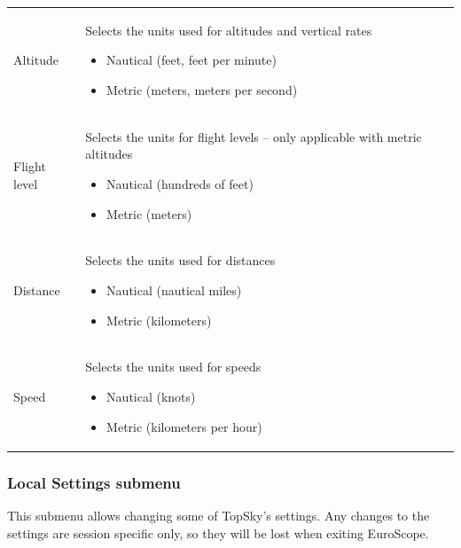 \documentclass[a4paper,oneside,11pt]{memoir}
\begin{document}
\begin{longtable}{p{5cm} p{7.5cm}}
  Altitude & Selects the units used for altitudes and vertical rates
    \begin{itemize}
      \item Nautical (feet, feet per minute)
      \item Metric (meters, meters per second)
    \end{itemize}\\
  Flight level & Selects the units for flight levels – only applicable with metric altitudes
    \begin{itemize}
      \item Nautical (hundreds of feet)
      \item Metric (meters)
    \end{itemize}\\
  Distance & Selects the units used for distances
    \begin{itemize}
      \item  Nautical (nautical miles)
      \item Metric (kilometers)
    \end{itemize}\\
  Speed & Selects the units used for speeds
    \begin{itemize}
      \item Nautical (knots)
      \item Metric (kilometers per hour)
    \end{itemize}\\
\end{longtable}

\subsubsection*{Local Settings submenu}
\label{menu:localset}

This submenu allows changing some of TopSky’s settings. Any changes to the settings are session specific only, so they will be lost when exiting EuroScope.

\bigskip
\end{document}
